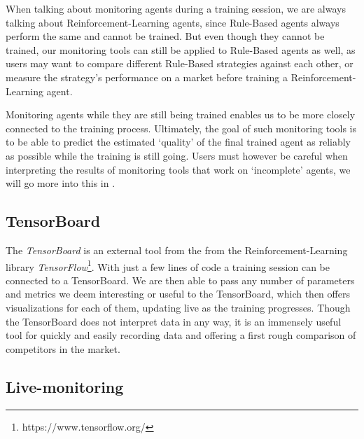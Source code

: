 When talking about monitoring agents during a training session, we are always talking about Reinforcement-Learning agents, since Rule-Based agents always perform the same and cannot be trained. But even though they cannot be trained, our monitoring tools can still be applied to Rule-Based agents as well, as users may want to compare different Rule-Based strategies against each other, or measure the strategy's performance on a market before training a Reinforcement-Learning agent.

Monitoring agents while they are still being trained enables us to be more closely connected to the training process. Ultimately, the goal of such monitoring tools is to be able to predict the estimated `quality' of the final trained agent as reliably as possible while the training is still going. Users must however be careful when interpreting the results of monitoring tools that work on `incomplete' agents, we will go more into this in .

\subsection*{TensorBoard}\label{subsec:TensorBoard}

The \emph{TensorBoard} is an external tool from the from the Reinforcement-Learning library \emph{TensorFlow}\footnote[0][-0.2]{https://www.tensorflow.org/}. With just a few lines of code  a training session can be connected to a TensorBoard. We are then able to pass any number of parameters and metrics we deem interesting or useful to the TensorBoard, which then offers visualizations for each of them, updating live as the training progresses. Though the TensorBoard does not interpret data in any way, it is an immensely useful tool for quickly and easily recording data and offering a first rough comparison of competitors in the market.

\subsection*{Live-monitoring}\label{subsec:LiveMonitoring}


